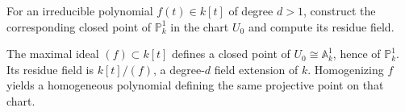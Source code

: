 \begin{problem}\label{prob:vi36-05}
For an irreducible polynomial \(f(t)\in k[t]\) of degree \(d>1\), construct the corresponding closed point of \(\mathbb P^1_k\) in the chart \(U_0\) and compute its residue field.
\begin{solution}
The maximal ideal \((f)\subset k[t]\) defines a closed point of \(U_0\cong\mathbb A^1_k\), hence of \(\mathbb P^1_k\).  Its residue field is \(k[t]/(f)\), a degree-\(d\) field extension of \(k\).  Homogenizing \(f\) yields a homogeneous polynomial defining the same projective point on that chart.
\end{solution}
\end{problem}
